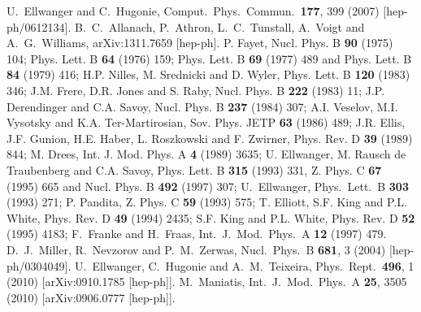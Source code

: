 \documentclass[final,3p,11pt,pdflatex]{elsarticle}
\begin{document}
\begin{thebibliography}{100}
  U.~Ellwanger and C.~Hugonie,
  Comput.\ Phys.\ Commun.\  {\bf 177}, 399 (2007)
  [hep-ph/0612134].
  B.~C.~Allanach, P.~Athron, L.~C.~Tunstall, A.~Voigt and A.~G.~Williams,
  arXiv:1311.7659 [hep-ph].
 P. Fayet, Nucl. Phys. B \textbf{90} (1975) 104; Phys. Lett.
B \textbf{64} (1976) 159; Phys. Lett. B \textbf{69} (1977) 489 and Phys. Lett. B
\textbf{84} (1979) 416; H.P. Nilles, M. Srednicki and D. Wyler, Phys. Lett. B
\textbf{120} (1983) 346; J.M. Frere, D.R. Jones and S. Raby, Nucl. Phys. B
\textbf{222} (1983) 11; J.P. Derendinger and C.A. Savoy, Nucl. Phys. B
\textbf{237} (1984) 307;  A.I. Veselov, M.I. Vysotsky and K.A. Ter-Martirosian,
Sov. Phys. JETP \textbf{63} (1986) 489; J.R. Ellis, J.F. Gunion, H.E. Haber, L.
Roszkowski and F. Zwirner, Phys. Rev. D \textbf{39}  (1989) 844; M. Drees, Int.
J. Mod. Phys. A \textbf{4}  (1989) 3635; U. Ellwanger, M. Rausch de
Traubenberg and C.A. Savoy, Phys. 
Lett. B \textbf{315} (1993) 331, Z. Phys. C {\bf 67} (1995) 665 and Nucl. Phys.
B \textbf{492} (1997) 307; U.~Ellwanger, Phys.\ Lett.\  B {\bf 303} (1993) 271; P.
Pandita, Z. Phys. C \textbf{59} (1993) 575; T. Elliott, S.F. King and P.L.
White, Phys. Rev. D {\bf 49} (1994) 2435; S.F. King and P.L. White, Phys. Rev. D
\textbf{52} (1995) 4183;  F.~Franke and H.~Fraas, Int.\ J.\ Mod.\ Phys.\  A {\bf
12} (1997) 479.   D.~J.~Miller, R.~Nevzorov and P.~M.~Zerwas,  Nucl.\ Phys.\ B {\bf 681}, 3 (2004) [hep-ph/0304049].
  U.~Ellwanger, C.~Hugonie and A.~M.~Teixeira,
  Phys.\ Rept.\  {\bf 496}, 1 (2010)
  [arXiv:0910.1785 [hep-ph]].
  M.~Maniatis,
  Int.\ J.\ Mod.\ Phys.\ A {\bf 25}, 3505 (2010)
  [arXiv:0906.0777 [hep-ph]].



\end{thebibliography}
\end{document}

